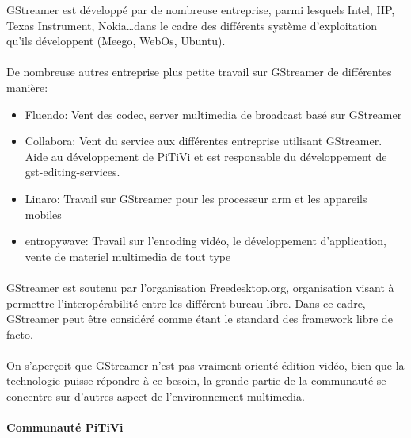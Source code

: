 GStreamer est développé par de nombreuse entreprise, parmi lesquels
Intel, HP, Texas Instrument, Nokia\ldots dans le cadre des différents
système d'exploitation qu'ils développent (Meego, WebOs, Ubuntu).

\paragraph{}

De nombreuse autres entreprise plus petite travail sur GStreamer de
différentes manière:

\begin{itemize}

  \item {Fluendo: Vent des codec, server multimedia de broadcast basé
  sur GStreamer}

  \item {Collabora: Vent du service aux différentes entreprise utilisant
  GStreamer.
    Aide au développement de PiTiVi et est responsable du développement
    de gst-editing-services.}

  \item {Linaro: Travail sur GStreamer pour les processeur arm et les
  appareils mobiles}

  \item {entropywave: Travail sur l'encoding vidéo, le développement
  d'application,
    vente de materiel multimedia de tout type}

\end{itemize}

\paragraph{}

GStreamer est soutenu par l'organisation Freedesktop.org, organisation
visant à permettre l'interopérabilité entre les différent bureau
libre.  Dans ce cadre, GStreamer peut être considéré comme étant le
standard des framework libre de facto.

\paragraph{}

On s'aperçoit que GStreamer n'est pas vraiment orienté édition vidéo,
bien que la technologie puisse répondre à ce besoin, la grande partie
de la communauté se concentre sur d'autres aspect de l'environnement
multimedia.

\paragraph{Communauté PiTiVi}

